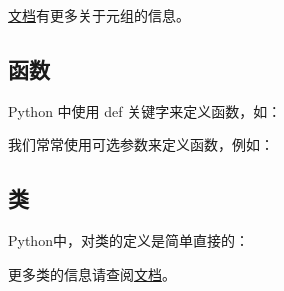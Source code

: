 \href{https://docs.python.org/3.5/tutorial/datastructures.html#tuples-and-sequences}{文档}有更多关于元组的信息。


\subsection{函数}


Python 中使用 def 关键字来定义函数，如：



我们常常使用可选参数来定义函数，例如：



\subsection{类}


Python中，对类的定义是简单直接的：



更多类的信息请查阅\href{https://docs.python.org/3.5/tutorial/classes.html}{文档}。
